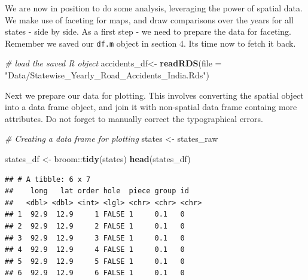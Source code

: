 \documentclass[]{article}
\newenvironment{Shaded}{}{}
\newcommand{\CommentTok}[1]{\textcolor[rgb]{0.38,0.63,0.69}{\textit{#1}}}
\newcommand{\DataTypeTok}[1]{\textcolor[rgb]{0.56,0.13,0.00}{#1}}
\newcommand{\KeywordTok}[1]{\textcolor[rgb]{0.00,0.44,0.13}{\textbf{#1}}}
\newcommand{\NormalTok}[1]{#1}
\newcommand{\OperatorTok}[1]{\textcolor[rgb]{0.40,0.40,0.40}{#1}}
\newcommand{\StringTok}[1]{\textcolor[rgb]{0.25,0.44,0.63}{#1}}
\begin{document}
We are now in position to do some analysis, leveraging the power of
spatial data. We make use of faceting for maps, and draw comparisons
over the years for all states - side by side. As a first step - we need
to prepare the data for faceting. Remember we saved our \texttt{df.m}
object in section 4. Its time now to fetch it back.

\begin{Shaded}
\begin{Highlighting}[]
\CommentTok{# load the saved R object}
\NormalTok{accidents_df<-}\StringTok{ }\KeywordTok{readRDS}\NormalTok{(}\DataTypeTok{file =} \StringTok{"Data/Statewise_Yearly_Road_Accidents_India.Rds"}\NormalTok{) }
\end{Highlighting}
\end{Shaded}

Next we prepare our data for plotting. This involves converting the
spatial object into a data frame object, and join it with non-spatial
data frame containg more attributes. Do not forget to manually correct
the typographical errors.

\begin{Shaded}
\begin{Highlighting}[]
\CommentTok{# Creating a data frame for plotting}
\NormalTok{states <-}\StringTok{  }\NormalTok{states_raw}

\NormalTok{states_df <-}\StringTok{ }\NormalTok{broom}\OperatorTok{::}\KeywordTok{tidy}\NormalTok{(states)}
\KeywordTok{head}\NormalTok{(states_df)}
\end{Highlighting}
\end{Shaded}

\begin{verbatim}
## # A tibble: 6 x 7
##    long   lat order hole  piece group id   
##   <dbl> <dbl> <int> <lgl> <chr> <chr> <chr>
## 1  92.9  12.9     1 FALSE 1     0.1   0    
## 2  92.9  12.9     2 FALSE 1     0.1   0    
## 3  92.9  12.9     3 FALSE 1     0.1   0    
## 4  92.9  12.9     4 FALSE 1     0.1   0    
## 5  92.9  12.9     5 FALSE 1     0.1   0    
## 6  92.9  12.9     6 FALSE 1     0.1   0
\end{verbatim}

\begin{Shaded}
\end{Shaded}
\end{document}

